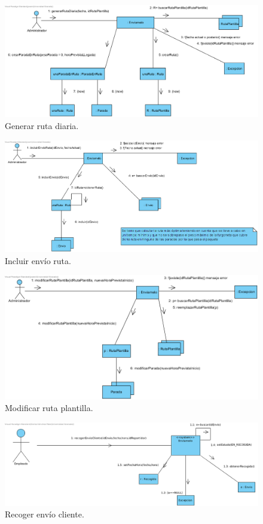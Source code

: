 \documentclass[12pt,spanish]{article}
\begin{document}
\begin{figure}[H]
\centering
\includegraphics[scale=0.5]{generarRutaDiaria.png}
\caption{Generar ruta diaria.}
\end{figure}

\begin{figure}[H]
\centering
\includegraphics[scale=0.5]{incluirEnvioRuta.png}
\caption{Incluir envío ruta.}
\end{figure}


\begin{figure}[H]
\centering
\includegraphics[scale=0.5]{modificarRutaPlantilla.png}
\caption{Modificar ruta plantilla.}
\end{figure}


\begin{figure}[H]
\centering
\includegraphics[scale=0.5]{recogerEnvioCliente.png}
\caption{Recoger envío cliente.}
\end{figure}
\end{document}
